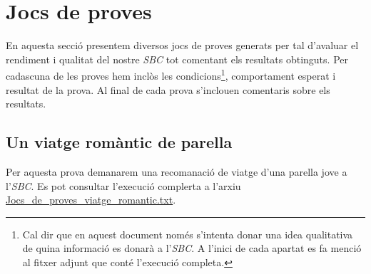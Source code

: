 \documentclass[11pt,a4paper]{article}
\begin{document}
\clearpage

\section{Jocs de proves}
En aquesta secció presentem diversos jocs de proves generats per tal d'avaluar el rendiment i qualitat del nostre \emph{SBC} tot comentant els resultats obtinguts. Per cadascuna de les proves hem inclòs les condicions\footnote{Cal dir que en aquest document només s'intenta donar una idea qualitativa de quina informació es donarà a l'\emph{SBC}. A l'inici de cada apartat es fa menció al fitxer adjunt que conté l'execució completa.}, comportament esperat i resultat de la prova. Al final de cada prova s'inclouen comentaris sobre els resultats.


\subsection{Un viatge romàntic de parella}

Per aquesta prova demanarem una recomanació de viatge d'una parella jove a l'\emph{SBC}. Es pot consultar l'execució complerta a l'arxiu \url{Jocs_de_proves_viatge_romantic.txt}.
\end{document}

